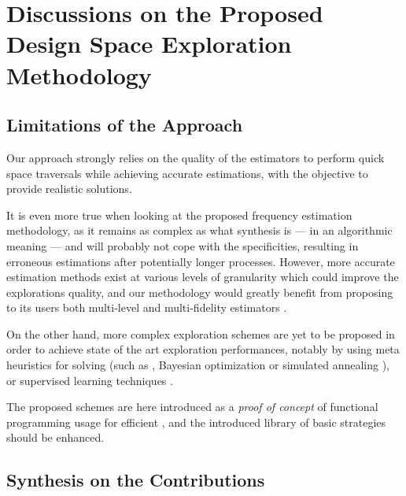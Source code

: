 
\clearpage
\section[Discussions on the Proposed DSE Methodology]{Discussions on the Proposed Design Space Exploration Methodology}
\label{ch.dse:sec.discussion}
    \subsection{Limitations of the Approach}
    \label{ch.dse:sec.discussion:ssec.limitations}

        Our approach strongly relies on the quality of the estimators to perform quick space traversals while achieving accurate estimations, with the objective to provide realistic solutions.

        It is even more true when looking at the proposed frequency estimation methodology, as it remains as complex as what synthesis is --- in an algorithmic meaning --- and will probably not cope with the  specificities, resulting in erroneous estimations after potentially longer processes.
        However, more accurate estimation methods exist at various levels of granularity which could improve the explorations quality, and our methodology would greatly benefit from proposing to its users both multi-level and multi-fidelity estimators \cite{ye_scalehls_2021}\cite{lo_multi-fidelity_2018}.

        On the other hand, more complex exploration schemes are yet to be proposed in order to achieve state of the art exploration performances, notably by using meta heuristics for  solving (such as  \cite{paletti_dovado_2021}, Bayesian optimization \cite{lo_model-based_2016} or simulated annealing \cite{witschen_circa_2019}), or supervised learning techniques \cite{nardi_practical_2019}\cite{ferretti_leveraging_2020}.

        The proposed schemes are here introduced as a {\it proof of concept} of functional programming usage for efficient , and the introduced library of basic strategies should be enhanced.

    \subsection{Synthesis on the Contributions}
    \label{ch.dse:sec.discussion:ssec.synthesis}

